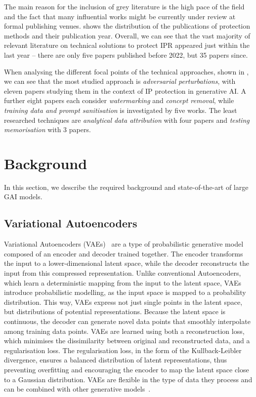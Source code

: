 \documentclass[conference,table]{IEEEtran} %
\begin{document}
The main reason for the inclusion of grey literature is the high pace of the field and the fact that many influential works might be currently under review at formal publishing venues.
 shows the distribution of the publications of protection methods and their publication year. 
Overall, we can see that the vast majority of relevant literature on technical solutions to protect IPR appeared just within the last year -- there are only five papers published before 2022, but 35 papers since.

When analysing the different focal points of the technical approaches, shown in , we can see that the most studied approach is \textit{adversarial perturbations}, with eleven papers studying them in the context of IP protection in generative AI.
A further eight papers each consider \textit{watermarking} and \textit{concept removal}, while \textit{training data and prompt sanitisation} is investigated by five works.
The least researched techniques are \textit{analytical data attribution} with four papers and \textit{testing memorisation} with 3 papers.

\section{Background}\label{sec:background}
In this section, we describe the required background and state-of-the-art of large GAI models.

\subsection{Variational Autoencoders}
Variational Autoencoders (VAEs)~\cite{kingma_auto-encoding_2022} are a type of probabilistic generative model composed of an encoder and decoder trained together. The encoder transforms the input to a lower-dimensional latent space, while the decoder reconstructs the input from this compressed representation. Unlike conventional Autoencoders, which learn a deterministic mapping from the input to the latent space, VAEs introduce probabilistic modelling, as the input space is mapped to a probability distribution. This way, VAEs express not just single points in the latent space, but distributions of potential representations. Because the latent space is continuous, the decoder can generate novel data points that smoothly interpolate among training data points. 
VAEs are learned using both a reconstruction loss, which minimises the dissimilarity between original and reconstructed data, and a regularisation loss. The regularisation loss, in the form of the Kullback-Leibler divergence, ensures a balanced distribution of latent representations, thus preventing overfitting and encouraging the encoder to map the latent space close to a Gaussian distribution. 
VAEs are flexible in the type of data they process and can be combined with other generative models~\cite{bao_cvae-gan_2017, pandey_diffusevae_2022}.
\end{document}

